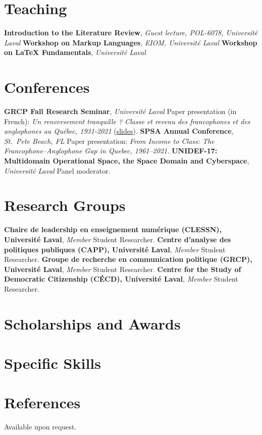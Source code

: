 \documentclass[10pt,letterpaper]{article}
\begin{document}
\section*{Teaching}
  {\textbf{Introduction to the Literature Review}, \textit{Guest lecture, POL-6078, Université Laval}}{}
  {\textbf{Workshop on Markup Languages}, \textit{EIOM, Université Laval}}{}
  {\textbf{Workshop on LaTeX Fundamentals}, \textit{Université Laval}}{}

\section*{Conferences}
  {\textbf{GRCP Fall Research Seminar}, \textit{Université Laval}}
  {Paper presentation (in French): \textit{Un renversement tranquille ? Classe et revenu des francophones et des anglophones au Québec, 1931-2021} (\href{https://www.masdupuis.com/presentation_grcp_2026/presentation.html}{slides}).}
  {\textbf{SPSA Annual Conference}, \textit{St.\ Pete Beach, FL}}
  {Paper presentation: \textit{From Income to Class: The Francophone--Anglophone Gap in Quebec, 1961--2021.}}
  {\textbf{UNIDEF-17: Multidomain Operational Space, the Space Domain and Cyberspace}, \textit{Université Laval}}
  {Panel moderator.}

\section*{Research Groups}
  {\textbf{Chaire de leadership en enseignement numérique (CLESSN), Université Laval}, \textit{Member}}
  {Student Researcher.}
  {\textbf{Centre d'analyse des politiques publiques (CAPP), Université Laval}, \textit{Member}}
  {Student Researcher.}
  {\textbf{Groupe de recherche en communication politique (GRCP), Université Laval}, \textit{Member}}
  {Student Researcher.}
  {\textbf{Centre for the Study of Democratic Citizenship (CÉCD), Université Laval}, \textit{Member}}
  {Student Researcher.}

\section*{Scholarships and Awards}

\section*{Specific Skills}

\section*{References}
Available upon request.
\end{document}
